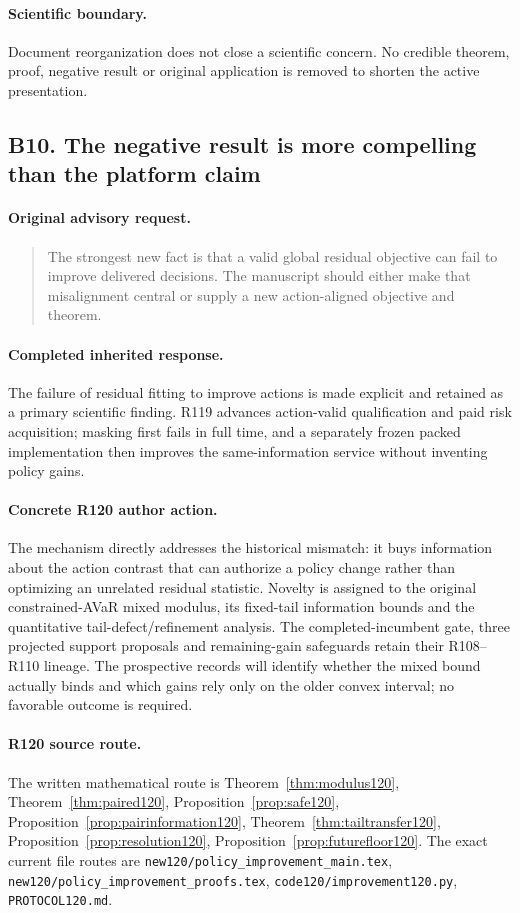 \paragraph{Scientific boundary.}
Document reorganization does not close a scientific concern. No credible theorem, proof, negative result or original application is removed to shorten the active presentation.

\subsection{B10. The negative result is more compelling than the platform claim}
\label{response120:B10}
\paragraph{Original advisory request.}
\begin{quote}
The strongest new fact is that a valid global residual objective can fail to improve delivered decisions. The manuscript should either make that misalignment central or supply a new action-aligned objective and theorem.
\end{quote}
\paragraph{Completed inherited response.}
The failure of residual fitting to improve actions is made explicit and retained as a primary scientific finding. R119 advances action-valid qualification and paid risk acquisition; masking first fails in full time, and a separately frozen packed implementation then improves the same-information service without inventing policy gains.
\paragraph{Concrete R120 author action.}
The mechanism directly addresses the historical mismatch: it buys information about the action contrast that can authorize a policy change rather than optimizing an unrelated residual statistic. Novelty is assigned to the original constrained-AVaR mixed modulus, its fixed-tail information bounds and the quantitative tail-defect/refinement analysis. The completed-incumbent gate, three projected support proposals and remaining-gain safeguards retain their R108--R110 lineage. The prospective records will identify whether the mixed bound actually binds and which gains rely only on the older convex interval; no favorable outcome is required.
\paragraph{R120 source route.}
The written mathematical route is Theorem~\ref{thm:modulus120}, Theorem~\ref{thm:paired120}, Proposition~\ref{prop:safe120}, Proposition~\ref{prop:pairinformation120}, Theorem~\ref{thm:tailtransfer120}, Proposition~\ref{prop:resolution120}, Proposition~\ref{prop:futurefloor120}. The exact current file routes are \nolinkurl{new120/policy_improvement_main.tex}, \nolinkurl{new120/policy_improvement_proofs.tex}, \nolinkurl{code120/improvement120.py}, \nolinkurl{PROTOCOL120.md}.
